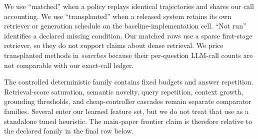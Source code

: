 \documentclass[manuscript,nonacm]{acmart}
\begin{document}
We use “matched” when a policy replays identical trajectories and shares our
call accounting. We use “transplanted” when a released system retains its own
retriever or generation schedule on the baseline-implementation cell. “Not
run” identifies a declared missing condition. Our matched rows use a sparse
first-stage retriever, so they do not support claims about dense retrieval.
We price transplanted methods in \emph{searches} because their per-question
LLM-call counts are not comparable with our exact-call ledger.

The controlled deterministic family contains fixed budgets and answer
repetition. Retrieval-score saturation, semantic novelty, query repetition,
context growth, grounding thresholds, and cheap-controller cascades remain
separate comparator families. Several enter our learned feature set, but we do
not treat that use as a standalone tuned heuristic. The main-paper frontier
claim is therefore relative to the declared family in the final row below.
\end{document}
